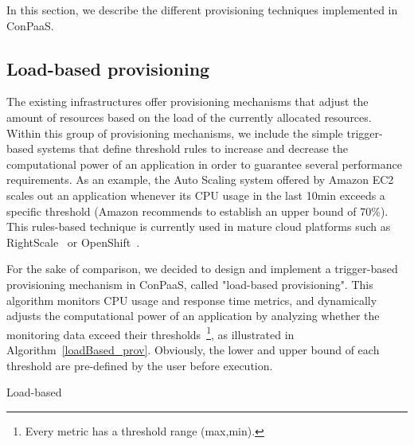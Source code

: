In this section, we describe the different provisioning techniques implemented in ConPaaS.



\subsection{Load-based provisioning}


The existing infrastructures offer provisioning mechanisms that adjust the amount of resources based on the load of the currently allocated resources. Within this group of provisioning mechanisms, we include the simple trigger-based systems that define threshold rules to increase and decrease the computational power of an application in order to guarantee several performance requirements. As an example, the Auto Scaling system offered by Amazon EC2~\cite{amazonEC2} scales out an application whenever its CPU usage in the last 10min exceeds a specific threshold (Amazon recommends to establish an upper bound of 70\%).  This rules-based technique is currently used in mature cloud platforms such as RightScale~\cite{right-scale} or OpenShift~\cite{openshift}. 

For the sake of comparison, we decided to design and implement a trigger-based provisioning mechanism in ConPaaS, called "load-based provisioning". This algorithm monitors CPU usage and response time metrics, and dynamically adjusts the computational power of an application by analyzing whether the monitoring data exceed their thresholds~\footnote{Every metric has a threshold range (max,min).}, as illustrated in Algorithm~\ref{loadBased_prov}. Obviously, the lower and upper bound of each threshold are pre-defined by the user before execution.

\begin{algorithm}
{\scriptsize
\SetAlgoLined
\SetInd{0mm}{2mm}
\BlankLine
{}
}
\caption{Load-based}
\label{loadBased_prov}
\end{algorithm}


